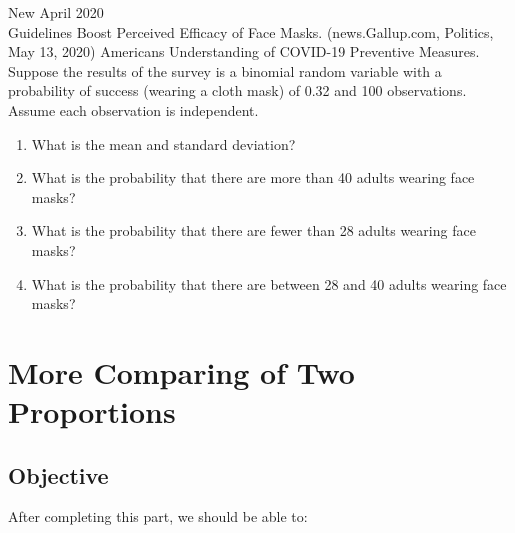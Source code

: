 \documentclass[11pt]{book}\usepackage[]{graphicx}\usepackage[]{color}
\begin{document}
\begin{exercises}
\begin{exercise}
New April 2020 \\ Guidelines Boost Perceived Efficacy of Face Masks.  (news.Gallup.com, Politics, May 13, 2020) Americans Understanding of COVID-19 Preventive Measures.  Suppose the results of the survey is a binomial random variable with a probability of success (wearing a cloth mask) of 0.32 and 100 observations.  Assume each observation is independent. 



\begin{enumerate}
\item What is the mean and standard deviation?
\item What is the probability that there are more than 40 adults wearing face \\ masks?
\item What is the probability that there are fewer than 28 adults wearing face \\ masks?
\item What is the probability that there are between 28 and 40 adults wearing face masks?
\end{enumerate}

\end{exercise}
\begin{solution}    %

\end{solution}

\end{exercises}

\onecolumn



\chapter{More Comparing of Two Proportions} 

\label{chap:ch10}

\section{Objective}

After completing this part, we should be able to:

\vspace{1mm}


\end{document}
